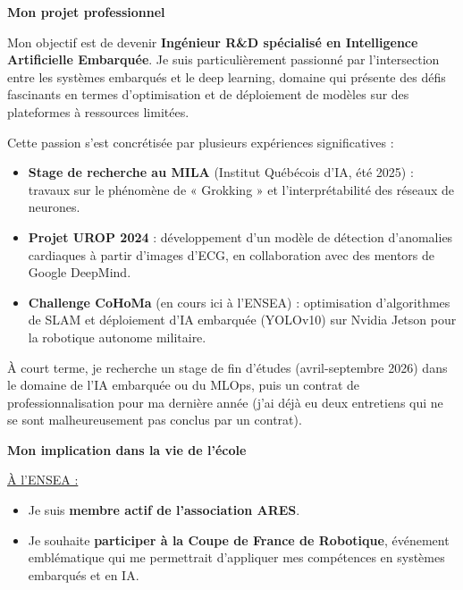 \documentclass[a4paper,11pt]{article}
\begin{document}
\vspace{0.4cm}

\textbf{\color{primary}Mon projet professionnel}

\vspace{0.2cm}

Mon objectif est de devenir \textbf{Ingénieur R\&D spécialisé en Intelligence Artificielle Embarquée}. Je suis particulièrement passionné par l'intersection entre les systèmes embarqués et le deep learning, domaine qui présente des défis fascinants en termes d'optimisation et de déploiement de modèles sur des plateformes à ressources limitées.

Cette passion s'est concrétisée par plusieurs expériences significatives :
\begin{itemize}
    \item \textbf{Stage de recherche au MILA} (Institut Québécois d'IA, été 2025) : travaux sur le phénomène de « Grokking » et l'interprétabilité des réseaux de neurones.
    \item \textbf{Projet UROP 2024} : développement d'un modèle de détection d'anomalies cardiaques à partir d'images d'ECG, en collaboration avec des mentors de Google DeepMind.
    \item \textbf{Challenge CoHoMa} (en cours ici à l'ENSEA) : optimisation d'algorithmes de SLAM et déploiement d'IA embarquée (YOLOv10) sur Nvidia Jetson pour la robotique autonome militaire.
\end{itemize}

À court terme, je recherche un stage de fin d'études (avril-septembre 2026) dans le domaine de l'IA embarquée ou du MLOps, puis un contrat de professionnalisation pour ma dernière année (j'ai déjà eu deux entretiens qui ne se sont malheureusement pas conclus par un contrat).

\vspace{0.4cm}

\textbf{\color{primary}Mon implication dans la vie de l'école}

\vspace{0.2cm}

\underline{À l'ENSEA :}
\begin{itemize}
    \item Je suis \textbf{membre actif de l'association ARES}.
    \item Je souhaite \textbf{participer à la Coupe de France de Robotique}, événement emblématique qui me permettrait d'appliquer mes compétences en systèmes embarqués et en IA.
\end{itemize}
\end{document}
